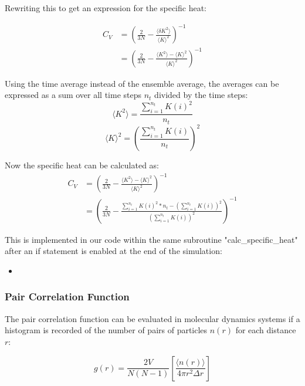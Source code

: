 \documentclass[
10pt, %
a4paper, %
oneside, %
headinclude,footinclude, %
BCOR5mm, %
]{scrartcl}
\newcommand{\insertcode}[2]{\begin{itemize}\item[]\end{itemize}} %
\begin{document}
\noindent
Rewriting this to get an expression for the specific heat:

\begin{align}
C_V &= \left (\frac{2}{3N} - \frac{\langle\delta K^2\rangle}{\langle K\rangle^2}\right)^{-1} \\
&= \left (\frac{2}{3N} - \frac{\langle K^2 \rangle - \langle K \rangle^2}{\langle K\rangle^2} \right )^{-1} 
\end{align}


\noindent
Using the time average instead of the ensemble average, the averages can be expressed as a sum over all time steps $n_t$ divided by the time steps:
\begin{equation} \langle K^2 \rangle  = \frac{\sum_{i=1}^{n_t} K(i)^2}{n_t} \end{equation}
\begin{equation} \langle K \rangle^2  = \left ( \frac{\sum_{i=1}^{n_t} K(i)  }{n_t} \right)^2 \end{equation}

\noindent
Now the specific heat can be calculated as:
\begin{align}
C_V &= \left (\frac{2}{3N} - \frac{\langle K^2 \rangle - \langle K \rangle^2}{\langle K\rangle^2} \right )^{-1} \\
&= \left ( \frac{2}{3N} - \frac{\sum_{i=1}^{n_t} K(i)^2*n_t - \left (\sum_{i=1}^{n_t} K(i) \right )^2 }{\left (\sum_{i=1}^{n_t} K(i) \right )^2 } \right )^{-1}
\end{align}

This is implemented in our code within the same subroutine "calc\_specific\_heat" after an if statement is enabled at the end of the simulation:
\insertcode{"Scripts/specific_heat_snippet_2.f90"}{Calculating the specific heat} %


\subsubsection{Pair Correlation Function}

The pair correlation function can be evaluated in molecular dynamics systems  if a histogram is recorded of the number of pairs of particles $n(r)$ for each distance $r$:

\begin{equation} g(r) = \frac{2V}{N(N-1)} \left [ \frac{\langle n(r) \rangle }{ 4 \pi r^2 \Delta r} \right ] \end{equation}
\end{document}
